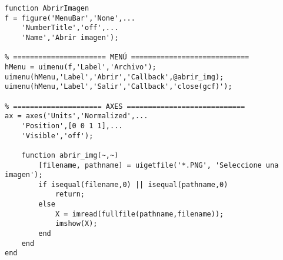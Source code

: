 \begin{verbatim}
function AbrirImagen
f = figure('MenuBar','None',...
    'NumberTitle','off',...
    'Name','Abrir imagen');

% ====================== MENÚ ============================
hMenu = uimenu(f,'Label','Archivo');
uimenu(hMenu,'Label','Abrir','Callback',@abrir_img);
uimenu(hMenu,'Label','Salir','Callback','close(gcf)');

% ===================== AXES ============================
ax = axes('Units','Normalized',...
    'Position',[0 0 1 1],...
    'Visible','off');

    function abrir_img(~,~)
        [filename, pathname] = uigetfile('*.PNG', 'Seleccione una imagen');
        if isequal(filename,0) || isequal(pathname,0)
            return;
        else
            X = imread(fullfile(pathname,filename));
            imshow(X);
        end
    end
end
\end{verbatim}

